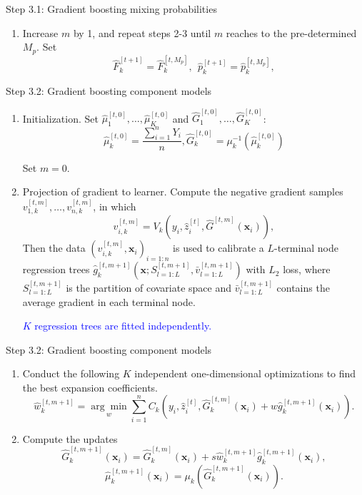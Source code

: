 \documentclass[professionalfont]{beamer}
\newcounter{saveenumi}
\newcommand{\seti}{\setcounter{saveenumi}{\value{enumi}}}
\newcommand{\conti}{\setcounter{enumi}{\value{saveenumi}}}
\def\bx{\boldsymbol{x}}
\newcommand{\blue}[1]{\textcolor{blue}{#1}}
\begin{document}
\begin{frame}{Step 3.1: Gradient boosting mixing probabilities}
	\begin{enumerate}
		\conti
		\item Increase $m$ by 1, and repeat steps 2-3  until $m$ reaches to the pre-determined $M_p$.
		Set $$\hat{F}_k^{[t+1]}=\hat{F}_k^{[t,M_p]},~~\hat{p}_k^{[t+1]}=\hat{p}_k^{[t,M_p]},$$
	\end{enumerate}

\end{frame}

\begin{frame}{Step 3.2: Gradient boosting component models}
		\begin{enumerate}
		\item Initialization. Set $\hat{\mu}_1^{[t,0]},\ldots,\hat{\mu}_K^{[t,0]}$ and $\hat{G}_1^{[t,0]},\ldots,\hat{G}_K^{[t,0]}$:
		$$\hat{\mu}_k^{[t,0]}=\frac{\sum_{i=1}^nY_i}{n}, \hat{G}_k^{[t,0]}=\mu_k^{-1}(\hat{\mu}_k^{[t,0]})$$

	Set $m=0$.
		\item Projection of gradient to learner.
		Compute the negative gradient samples $v_{1,k}^{[t,m]},\ldots,v_{n,k}^{[t,m]}$, in which
		$$v_{i,k}^{[t,m]}=V_k(y_i,\hat{z}^{[t]}_{i},\hat{G}^{[t,m]}(\bx_i)),$$
		Then the data $(v_{i,k}^{[t,m]},\bx_i)_{i=1:n}$ is used to calibrate a $L$-terminal node regression trees $\hat{g}_k^{[t,m+1]}\left(\bx;S^{[t,m+1]}_{l=1:L},\bar{v}^{[t,m+1]}_{l=1:L}\right)$ with $L_2$ loss, where $S^{[t,m+1]}_{l=1:L}$ is the partition of covariate space and $\bar{v}^{[t,m+1]}_{l=1:L}$ contains the average gradient in each terminal node.

				\blue{$K$ regression trees are fitted independently.}
		\seti
	\end{enumerate}
\end{frame}

\begin{frame}{Step 3.2: Gradient boosting component models}
	\begin{enumerate}
		\conti
		\item  Conduct the following $K$ independent one-dimensional optimizations to find the best expansion coefficients.
			$$\hat{w}_{k}^{[t,m+1]}=\underset{w}{\arg\min}\sum_{i=1}^n C_{k}(y_i,\hat{z}_i^{[t]},\hat{G}_k^{[t,m]}(\bx_i)+w\hat{g}_k^{[t,m+1]}(\bx_i)).$$

		\item  Compute the updates
		$$\hat{G}_k^{[t,m+1]}(\bx_i)=\hat{G}_k^{[t,m]}(\bx_i)+s\hat{w}_{k}^{[t,m+1]}\hat{g}_{k}^{[t,m+1]}(\bx_i),$$
		$$\hat{\mu}_k^{[t,m+1]}(\bx_i)=\mu_k(\hat{G}_k^{[t,m+1]}(\bx_i)).$$
\seti
	\end{enumerate}
\end{frame}
\end{document}
